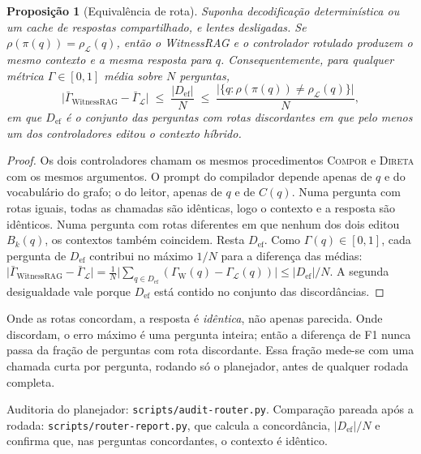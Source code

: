 \documentclass[11pt]{article}
\newtheorem{proposicao}{Proposição}
\newcommand{\Compose}{\textsc{Compor}}
\newcommand{\Direct}{\textsc{Direta}}
\begin{document}
\begin{proposicao}[Equivalência de rota]\label{prop:equivalencia}
Suponha decodificação determinística ou um cache de respostas compartilhado,
e lentes desligadas. Se $\rho(\pi(q))=\rho_{\mathcal{L}}(q)$, então o
WitnessRAG e o controlador rotulado produzem o mesmo contexto e a mesma
resposta para $q$. Consequentemente, para qualquer métrica $\Gamma\in[0,1]$
média sobre $N$ perguntas,
\begin{equation}
  \bigl|\bar\Gamma_{\text{WitnessRAG}}-\bar\Gamma_{\mathcal{L}}\bigr|
  \;\le\; \frac{|D_{\text{ef}}|}{N}
  \;\le\; \frac{\bigl|\{q:\rho(\pi(q))\neq\rho_{\mathcal{L}}(q)\}\bigr|}{N},
  \label{eq:cota}
\end{equation}
em que $D_{\text{ef}}$ é o conjunto das perguntas com rotas discordantes em
que pelo menos um dos controladores editou o contexto híbrido.
\end{proposicao}
\begin{proof}
Os dois controladores chamam os mesmos procedimentos \Compose{} e \Direct{}
com os mesmos argumentos. O prompt do compilador depende apenas de $q$ e do
vocabulário do grafo; o do leitor, apenas de $q$ e de $C(q)$. Numa pergunta
com rotas iguais, todas as chamadas são idênticas, logo o contexto e a
resposta são idênticos. Numa pergunta com rotas diferentes em que nenhum dos
dois editou $B_k(q)$, os contextos também coincidem. Resta $D_{\text{ef}}$.
Como $\Gamma(q)\in[0,1]$, cada pergunta de $D_{\text{ef}}$ contribui no
máximo $1/N$ para a diferença das médias:
$\bigl|\bar\Gamma_{\text{WitnessRAG}}-\bar\Gamma_{\mathcal{L}}\bigr|
=\tfrac1N\bigl|\sum_{q\in D_{\text{ef}}}(\Gamma_{\text{W}}(q)-\Gamma_{\mathcal{L}}(q))\bigr|
\le|D_{\text{ef}}|/N$.
A segunda desigualdade vale porque $D_{\text{ef}}$ está contido no conjunto
das discordâncias.
\end{proof}

\begin{empalavras}
Onde as rotas concordam, a resposta é \emph{idêntica}, não apenas parecida.
Onde discordam, o erro máximo é uma pergunta inteira; então a diferença de F1
nunca passa da fração de perguntas com rota discordante. Essa fração mede-se
com uma chamada curta por pergunta, rodando só o planejador, antes de
qualquer rodada completa.
\end{empalavras}

\begin{nocodigo}
Auditoria do planejador: \texttt{scripts/audit-router.py}. Comparação pareada
após a rodada: \texttt{scripts/router-report.py}, que calcula a concordância,
$|D_{\text{ef}}|/N$ e confirma que, nas perguntas concordantes, o contexto é
idêntico.
\end{nocodigo}
\end{document}
